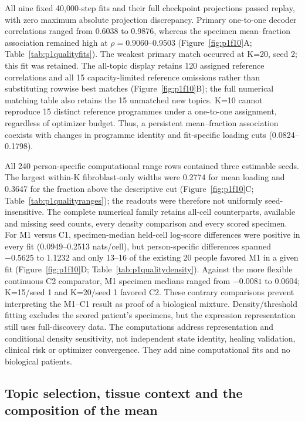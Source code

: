 All nine fixed 40,000-step fits and their full checkpoint projections passed replay, with zero maximum absolute projection discrepancy. Primary one-to-one decoder correlations ranged from 0.6038 to 0.9876, whereas the specimen mean--fraction association remained high at $\rho=0.9060$--0.9503 (Figure~\ref{fig:p1f10}A\label{call:p1f10}; Table~\ref{tab:p1qualityfits}). The weakest primary match occurred at K=20, seed 2; this fit was retained. The all-topic display retains 120 assigned reference correlations and all 15 capacity-limited reference omissions rather than substituting rowwise best matches (Figure~\ref{fig:p1f10}B); the full numerical matching table also retains the 15 unmatched new topics. K=10 cannot reproduce 15 distinct reference programmes under a one-to-one assignment, regardless of optimizer budget. Thus, a persistent mean--fraction association coexists with changes in programme identity and fit-specific loading cuts (0.0824--0.1798).



All 240 person-specific computational range rows contained three estimable seeds. The largest within-K fibroblast-only widths were 0.2774 for mean loading and 0.3647 for the fraction above the descriptive cut (Figure~\ref{fig:p1f10}C; Table~\ref{tab:p1qualityranges}); the readouts were therefore not uniformly seed-insensitive. The complete numerical family retains all-cell counterparts, available and missing seed counts, every density comparison and every scored specimen. For M1 versus C1, specimen-median held-cell log-score differences were positive in every fit (0.0949--0.2513 nats/cell), but person-specific differences spanned $-0.5625$ to 1.1232 and only 13--16 of the existing 20 people favored M1 in a given fit (Figure~\ref{fig:p1f10}D; Table~\ref{tab:p1qualitydensity}). Against the more flexible continuous C2 comparator, M1 specimen medians ranged from $-0.0081$ to 0.0604; K=15/seed 1 and K=20/seed 1 favored C2. These contrary comparisons prevent interpreting the M1--C1 result as proof of a biological mixture. Density/threshold fitting excludes the scored patient's specimens, but the expression representation still uses full-discovery data. The computations address representation and conditional density sensitivity, not independent state identity, healing validation, clinical risk or optimizer convergence. They add nine computational fits and no biological patients.

\subsection{Topic selection, tissue context and the composition of the mean}

